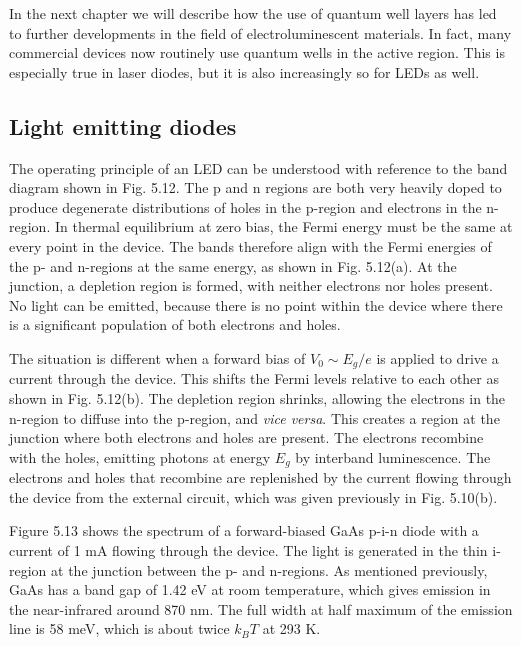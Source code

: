 \documentclass[12pt]{book}
\begin{document}
{In the next chapter we will describe how the use of quantum well layers has led to further developments in the field of electroluminescent materials. In fact, many commercial devices now routinely use quantum wells in the active region. This is especially true in laser diodes, but it is also increasingly so for LEDs as well.
\subsection{Light emitting diodes}
The operating principle of an LED can be understood with reference to the band diagram shown in Fig. 5.12. The p and n regions are both very heavily doped to produce degenerate distributions of holes in the p-region and electrons in the n-region. In thermal equilibrium at zero bias, the Fermi energy must be the same at every point in the device. The bands therefore align with the Fermi energies of the p- and n-regions at the same energy, as shown in Fig. 5.12(a). At the junction, a depletion region is formed, with neither electrons nor holes present. No light can be emitted, because there is no point within the device where there is a significant population of both electrons and holes.

The situation is different when a forward bias of $V_0\sim E_g/e$ is applied to drive a current through the device. This shifts the Fermi levels relative to each other as shown in Fig. 5.12(b). The depletion region shrinks, allowing the electrons in the n-region to diffuse into the p-region, and \textit{vice versa}. This creates a region at the junction where both electrons and holes are present. The electrons recombine with the holes, emitting photons at energy $E_g$ by interband luminescence. The electrons and holes that recombine are replenished by the current flowing through the device from the external circuit, which was given previously in Fig. 5.10(b).

Figure 5.13 shows the spectrum of a forward-biased GaAs p-i-n diode with a current of 1 mA flowing through the device. The light is generated in the thin i-region at the junction between the p- and n-regions. As mentioned previously, GaAs has a band gap of 1.42 eV at room temperature, which gives emission in the near-infrared around 870 nm. The full width at half maximum of the emission line is 58 meV, which is about twice $k_BT$ at 293 K.

}
\end{document}
